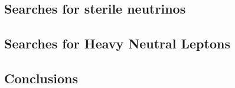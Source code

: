 \documentclass[../report.tex]{subfiles}
\providecommand{\main}{..}
\begin{document}
\subsection{Searches for sterile neutrinos}

\subsection{Searches for Heavy Neutral Leptons} \label{hnl-sec-nu}


\subsection{ Conclusions} 







%
\end{document}
